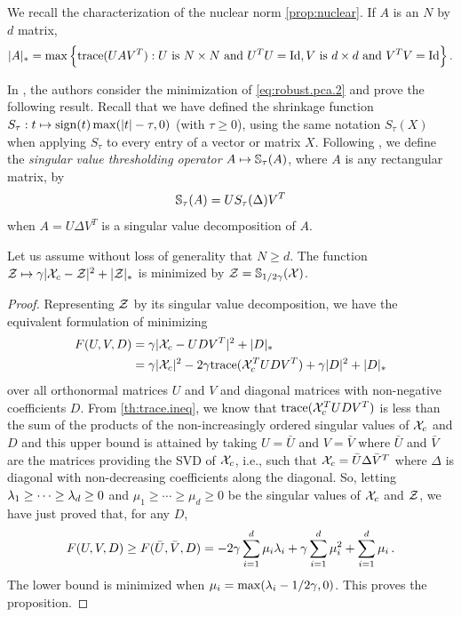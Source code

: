 We recall the characterization of the nuclear norm \cref{prop:nuclear}. If $A$ is an  $N$ by $d$ matrix,
\[
|A|_* = \max\Big\{\trace(UAV^T): U \text{ is }N\times N \text{ and } U^TU = \Id,  V \text{ is } d\times d \text{ and } V^TV = \Id\Big\}\,.
\]

In \citet{cai2010singular}, the authors consider the minimization of \cref{eq:robust.pca.2} 
and prove the following result. Recall that we have defined the shrinkage function $S_\tau: t \mapsto \operatorname{sign}(t)\max(|t|-\tau, 0)$ (with $\tau \geq 0$), using the same notation $S_\tau(X)$ when applying $S_\tau$ to every entry of a vector or matrix $X$.   Following \citet{cai2010singular}, we define the {\em singular value thresholding operator} $A \mapsto {\mathbb S}_\tau(A)$, where $A$ is any rectangular matrix, by
\[
{\mathbb S}_\tau(A) = US_\tau(\Delta) V^T
\]
when $A = U\Delta V^T$ is a singular value decomposition of $A$.
\begin{proposition}
\label{prop:sh.svd}
Let us assume without loss of generality that $N\geq d$. 
The function ${\mathcal Z} \mapsto {\gamma} |{\mathcal X}_c - {\mathcal Z}|^2+  |{\mathcal Z}|_*$ is minimized by ${\mathcal Z} = {\mathbb S}_{1/2\gamma}({\mathcal X})$.
\end{proposition}
\begin{proof}
Representing ${\mathcal Z}$ by its singular value decomposition, we have the equivalent formulation of minimizing 
\begin{align*}
F(U, V, D) &= \gamma|{\mathcal X}_c - UDV^T|^2 +  |D|_*\\
&= \gamma|{\mathcal X}_c|^2 - 2\gamma{\mathrm{trace}}({\mathcal X}_c^TUDV^T) + \gamma|D|^2 + |D|_*
\end{align*}
over all orthonormal matrices $U$ and $V$ and diagonal matrices with non-negative coefficients $D$. From \cref{th:trace.ineq}, we know that ${\mathrm{trace}}({\mathcal X}_c^TUDV^T)$ is less than the sum of the products of the non-increasingly ordered singular values of ${\mathcal X}_c$ and $D$ and this upper bound is attained by taking $U= \bar U$ and $V=\bar V$ where $\bar U$ and $\bar V$ are  the matrices providing the SVD of ${\mathcal X}_c$, i.e., such that ${\mathcal X}_c = \bar U\Delta \bar V^T$ where $\Delta$ is diagonal with non-decreasing coefficients along the diagonal. So, letting $\lambda_1 \geq \cdots \geq \lambda_d \geq 0$ and $\mu_1 \geq \cdots \geq \mu_d\geq 0$ be the singular values of ${\mathcal X}_c$ and ${\mathcal Z}$, we have just proved that, for any $D$,
\[
F(U, V, D) \geq  F(\bar U, \bar V, D) = -2\gamma \sum_{i=1}^d \mu_i\lambda_i + \gamma\sum_{i=1}^d \mu_i^2 + \sum_{i=1}^d\mu_i\,.
\]
The lower bound is minimized when  $\mu_i = \max(\lambda_i - 1/2\gamma, 0)$. This proves the proposition.
\end{proof}



